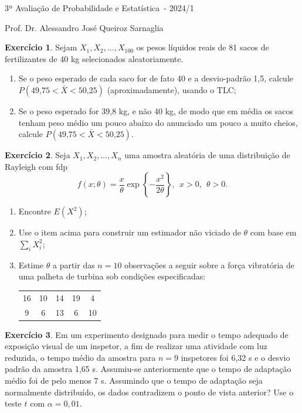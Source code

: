 \documentclass[]{article}
\newcommand{\avaliacao}{3}
\newcommand{\disciplina}{Probabilidade e Estatística}
\newcommand{\semestre}{2024/1}
\theoremstyle{definition}
\newtheorem{ex}{Exercício}
\begin{document}
\thispagestyle{empty}
\begin{center}
\Large{\avaliacao ª Avaliação de \disciplina\ - \semestre}

\large{Prof. Dr. Alessandro José Queiroz Sarnaglia}
\end{center}

\begin{ex}
Sejam $X_1, X_2, \ldots , X_{100}$ os pesos líquidos reais de 81 sacos de fertilizantes de 40 kg selecionados aleatoriamente.
\begin{enumerate}
	\item Se o peso esperado de cada saco for de fato 40 e a desvio-padrão 1,5, calcule $P(49\text{,}75 < \bar{X} < 50\text{,}25)$ (aproximadamente), usando o TLC;
	\item Se o peso esperado for 39,8 kg, e não 40 kg, de modo que em média os sacos tenham peso médio um pouco abaixo do anunciado um pouco a muito cheios, calcule $P(49\text{,}75 < \bar{X} < 50\text{,}25)$.
\end{enumerate}
\end{ex}


\begin{ex}
Seja $X_1, X_2, \ldots, X_n$ uma amostra aleatória de uma distribuição de Rayleigh com fdp
$$
f(x;\theta) = \frac{x}{\theta}\exp\left\{-\frac{x^2}{2\theta}\right\}, \ \ x > 0, \ \ \theta>0.
$$
\begin{enumerate}
	\item Encontre $E(X^2)$;
	\item Use o item acima para construir um estimador não viciado de $\theta$ com base em $\sum_iX_i^2$;
	\item Estime $\theta$ a partir das $n = 10$ observações a seguir sobre a força vibratória de uma palheta de turbina sob condições especificadas:
	\begin{center}
	\begin{tabular}{ccccc}
		16& 10& 14& 19&	4\\
		9 & 6 & 13& 6 &10\\
	\end{tabular}
	\end{center}
\end{enumerate}
\end{ex}


\begin{ex}
Em um experimento designado para medir o tempo adequado de exposição visual de um inspetor, a ﬁm de realizar uma atividade com luz reduzida, o tempo médio da amostra para $n = 9$ inspetores foi 6,32 s e o desvio padrão da amostra 1,65 s. Assumiu-se anteriormente que o tempo de adaptação médio foi de pelo menos 7 s. Assumindo que o tempo de adaptação seja normalmente distribuído, os dados contradizem o ponto de vista anterior? Use o teste $t$ com $\alpha = 0,01$.
\end{ex}
\end{document}
